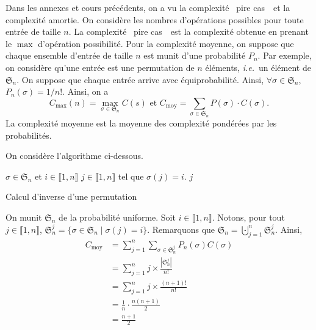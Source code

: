 \documentclass[a4paper]{article}
\begin{document}
	Dans les annexes et cours précédents, on a vu la complexité \guillemotleft~pire cas~\guillemotright\ et la complexité amortie.
	On considère les nombres d'opérations possibles pour toute entrée de taille $n$.
	La complexité \guillemotleft~pire cas~\guillemotright\ est la complexité obtenue en prenant le $\max$ d'opération possibilité.
	Pour la complexité moyenne, on suppose que chaque ensemble d'entrée de taille $n$ est munit d'une probabilité $P_n$.
	Par exemple, on considère qu'une entrée est une permutation de $n$ éléments, \textit{i.e.}\ un élément de $\mathfrak{S}_n$.
	On suppose que chaque entrée arrive avec équiprobabilité. Ainsi, $\forall \sigma \in \mathfrak{S}_n$, $P_n(\sigma) = 1/n!$.
	Ainsi, on a \[
		C_{\max}(n) = \max_{\sigma \in \mathfrak{S}_n} C(s) \text{ et } C_{\mathrm{moy}} = \sum_{\sigma \in \mathfrak{S}_n} P(\sigma) \cdot C(\sigma)
	.\]
	La complexité moyenne est la moyenne des complexité pondérées par les probabilités.

	\begin{exm}
		On considère l'algorithme ci-dessous.
		\begin{algorithm}[H]
			\centering
			\begin{algorithmic}[1]
				\Entree $\sigma \in \mathfrak{S}_n$ et $i \in \llbracket 1,n \rrbracket$
				\Sortie $j \in \llbracket 1,n \rrbracket$ tel que $\sigma(j) = i$.
				 \Return $j$
				\EndIf
				\EndFor
			\end{algorithmic}
			\caption{Calcul d'inverse d'une permutation}
		\end{algorithm}
		\noindent
		On munit $\mathfrak{S}_n$ de la probabilité uniforme.
		Soit $i \in \llbracket 1,n \rrbracket$.
		Notons, pour tout $j \in \llbracket 1,n \rrbracket$, $\mathfrak{S}_n^j = \{\sigma \in \mathfrak{S}_n  \mid \sigma(j) = i\}$.
		Remarquons que $\mathfrak{S}_n = \bigcupdot_{j=1}^n \mathfrak{S}_n^j$.
		Ainsi,
		\begin{align*}
			C_{\mathrm{moy}} &= \sum_{j=1}^n \sum_{\sigma \in \mathfrak{S}_n^j}P_n(\sigma) C(\sigma)\\
			&= \sum_{j=1}^n j \times \frac{|\mathfrak{S}_n^j|}{n!}\\
			&= \sum_{j=1}^n j \times \frac{(n+1)!}{n!}\\
			&= \frac{1}{n} \cdot \frac{n(n+1)}{2}\\
			&= \frac{n+1}{2}
		\end{align*}
	\end{exm}
\end{document}
